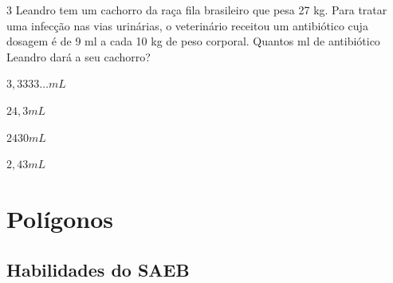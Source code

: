 {{\num{3} Leandro tem um cachorro da raça fila brasileiro que pesa 27 kg. Para
tratar uma infecção nas vias urinárias, o veterinário receitou um
antibiótico cuja dosagem é de 9 ml a cada 10 kg de peso corporal.
Quantos ml de antibiótico Leandro dará a seu cachorro?

\begin{escolha}[itemsep=0pt]
\item $3,3333\ldots mL$
\item $24,3 mL$
\item $2430 mL$
\item $2,43 mL$
\end{escolha}












\chapter{Polígonos}

\section*{Habilidades do SAEB}

}}
